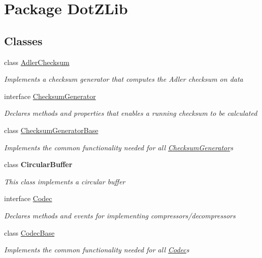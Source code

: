 \hypertarget{namespace_dot_z_lib}{\section{Package Dot\+Z\+Lib}
\label{namespace_dot_z_lib}
}
\subsection*{Classes}
\begin{DoxyCompactItemize}
\item 
class \hyperlink{class_dot_z_lib_1_1_adler_checksum}{Adler\+Checksum}
\begin{DoxyCompactList}\small\item\em Implements a checksum generator that computes the Adler checksum on data \end{DoxyCompactList}\item 
interface \hyperlink{interface_dot_z_lib_1_1_checksum_generator}{Checksum\+Generator}
\begin{DoxyCompactList}\small\item\em Declares methods and properties that enables a running checksum to be calculated \end{DoxyCompactList}\item 
class \hyperlink{class_dot_z_lib_1_1_checksum_generator_base}{Checksum\+Generator\+Base}
\begin{DoxyCompactList}\small\item\em Implements the common functionality needed for all \hyperlink{interface_dot_z_lib_1_1_checksum_generator}{Checksum\+Generator}s \end{DoxyCompactList}\item 
class {\bfseries Circular\+Buffer}
\begin{DoxyCompactList}\small\item\em This class implements a circular buffer \end{DoxyCompactList}\item 
interface \hyperlink{interface_dot_z_lib_1_1_codec}{Codec}
\begin{DoxyCompactList}\small\item\em Declares methods and events for implementing compressors/decompressors \end{DoxyCompactList}\item 
class \hyperlink{class_dot_z_lib_1_1_codec_base}{Codec\+Base}
\begin{DoxyCompactList}\small\item\em Implements the common functionality needed for all \hyperlink{interface_dot_z_lib_1_1_codec}{Codec}s \end{DoxyCompactList}\item 

\end{DoxyCompactItemize}
